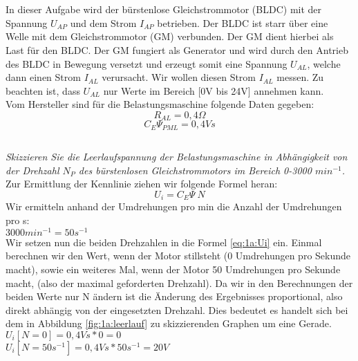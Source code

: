 
\chapter{}\label{ch:auf1}
In dieser Aufgabe wird der bürstenlose Gleichstrommotor (BLDC) mit der Spannung $ U_{AP} $ und dem Strom $ I_{AP} $ betrieben. Der BLDC ist starr über eine Welle mit dem Gleichstrommotor (GM) verbunden. Der GM dient hierbei als Last für den BLDC. Der GM fungiert als Generator und wird durch den Antrieb des BLDC in Bewegung versetzt und erzeugt somit eine Spannung $ U_{AL} $, welche dann einen Strom $ I_{AL} $ verursacht. Wir wollen diesen Strom $ I_{AL} $ messen. Zu beachten ist, dass $ U_{AL} $ nur Werte im Bereich [0V bis 24V] annehmen kann. \\Vom Hersteller sind für die Belastungsmaschine folgende Daten gegeben:
\begin{equation}
	R_{AL} = 0,4\Omega
\end{equation}
\begin{equation}
	C_{E}\Psi_{PML} = 0,4Vs 
\end{equation}

\section{}\label{sec:1a}
\textit{Skizzieren Sie die Leerlaufspannung der Belastungsmaschine in Abhängigkeit von der Drehzahl $ N_{P} $ des bürstenlosen Gleichstrommotors im Bereich 0-3000 $ min^{-1} $.}\\
Zur Ermittlung der Kennlinie ziehen wir folgende Formel heran:
\begin{equation}
	U_{i} = C_{E}\Psi~N
	\label{eq:1a:Ui}
\end{equation}
Wir ermitteln anhand der Umdrehungen pro min die Anzahl der Umdrehungen pro s: \\
$ 3000 min^{-1} = 50 s^{-1} $\\
Wir setzen nun die beiden Drehzahlen in die Formel \ref{eq:1a:Ui} ein. Einmal berechnen wir den Wert, wenn der Motor stillsteht (0 Umdrehungen pro Sekunde macht), sowie ein weiteres Mal, wenn der Motor 50 Umdrehungen pro Sekunde macht, (also der maximal geforderten Drehzahl). Da wir in den Berechnungen der beiden Werte nur N ändern ist die Änderung des Ergebnisses proportional, also direkt abhängig von der eingesetzten Drehzahl. Dies bedeutet es handelt sich bei dem in Abbildung \ref{fig:1a:leerlauf} zu skizzierenden Graphen um eine Gerade. \\
$ U_{i}[N=0] = 0,4Vs * 0 = 0 $\\
$ U_{i}[N=50 s^{-1}] = 0,4Vs * 50s^{-1} = 20V $

